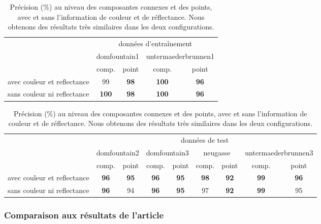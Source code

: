 \documentclass[a4paper, onecolumn, 11pt]{article}
\begin{document}
\begin{table}[p]
\caption{Précision (\%) au niveau des composantes connexes et des points, avec et sans l'information de couleur et de réflectance. Nous obtenons des résultats très similaires dans les deux configurations.}

\begin{tabular}{l|c|c|c|c|}
\cline{2-5}
 & \multicolumn{4}{c|}{données d'entraînement} \\
\cline{2-5} 
 & \multicolumn{2}{c|}{domfountain1} & \multicolumn{2}{c|}{untermaederbrunnen1} \\
\cline{2-5} 
 & comp. & point & comp. & point \\
\hline
\multicolumn{1}{|l|}{avec couleur et reflectance} & 99 & \textbf{98} & \textbf{100} & \textbf{96}\\
\hline
\multicolumn{1}{|l|}{sans couleur ni reflectance} & \textbf{100} & \textbf{98} & \textbf{100} & \textbf{96} \\
\hline
\end{tabular}

\bigskip

\begin{tabular}{l|c|c|c|c|c|c|c|c|}
\cline{2-9}
 & \multicolumn{8}{c|}{données de test}\\
\cline{2-9} 
 & \multicolumn{2}{c|}{domfountain2} & \multicolumn{2}{c|}{domfountain3} & \multicolumn{2}{c|}{neugasse} & \multicolumn{2}{c|}{untermaederbrunnen3} \\
\cline{2-9} 
 & comp.& point & comp. & point & comp. & point & comp. & point \\
\hline
\multicolumn{1}{|l|}{avec couleur et reflectance} & \textbf{96} & \textbf{95} & \textbf{96} & \textbf{95} & \textbf{98} & \textbf{92} & \textbf{99} & \textbf{96}\\
\hline
\multicolumn{1}{|l|}{sans couleur ni reflectance} & \textbf{96} & 94 & \textbf{96} & \textbf{95} & 97 & \textbf{92} & \textbf{99} & 95 \\
\hline
\end{tabular}
\label{table:laser_color}
\end{table}
\subsubsection{Comparaison aux résultats de l'article}
\end{document}
